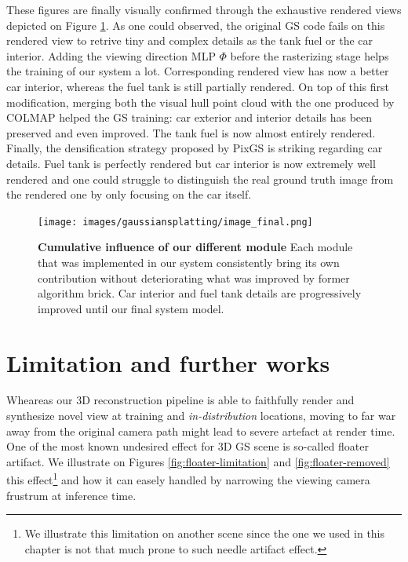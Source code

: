 These figures are finally visually confirmed through the exhaustive rendered views depicted on Figure \ref{fig:gs-vh-result}. As one could observed, the original GS code fails on this rendered view to retrive tiny and complex details as the tank fuel or the car interior. Adding the viewing direction MLP $\Phi$ before the rasterizing stage helps the training of our system a lot. Corresponding rendered view has now a better car interior, whereas the fuel tank is still partially rendered. On top of this first modification, merging both the visual hull point cloud with the one produced by COLMAP helped the GS training: car exterior and interior details has been preserved and even improved. The tank fuel is now almost entirely rendered. Finally, the densification strategy proposed by PixGS is striking regarding car details. Fuel tank is perfectly rendered but car interior is now extremely well rendered and one could struggle to distinguish the real ground truth image from the rendered one by only focusing on the car itself.   

\begin{figure}[htb!]
  \center
\texttt{[image: images/gaussiansplatting/image\_final.png]}
\caption{\textbf{Cumulative influence of our different module} Each module that was implemented in our system consistently bring its own contribution without deteriorating what was improved by former algorithm brick. Car interior and fuel tank details are progressively improved until our final system model.}
\label{fig:gs-vh-result}
\end{figure}

\section{Limitation and further works}

Wheareas our 3D reconstruction pipeline is able to faithfully render and synthesize novel view at training and \textit{in-distribution} locations, moving to far war away from the original camera path might lead to severe artefact at render time. One of the most known undesired effect for 3D \ac{GS} scene is so-called floater artifact. We illustrate on Figures \ref{fig:floater-limitation} and \ref{fig:floater-removed} this effect\footnote{We illustrate this limitation on another scene since the one we used in this chapter is not that much prone to such needle artifact effect.} and how it can easely handled by narrowing the viewing camera frustrum at inference time. 

